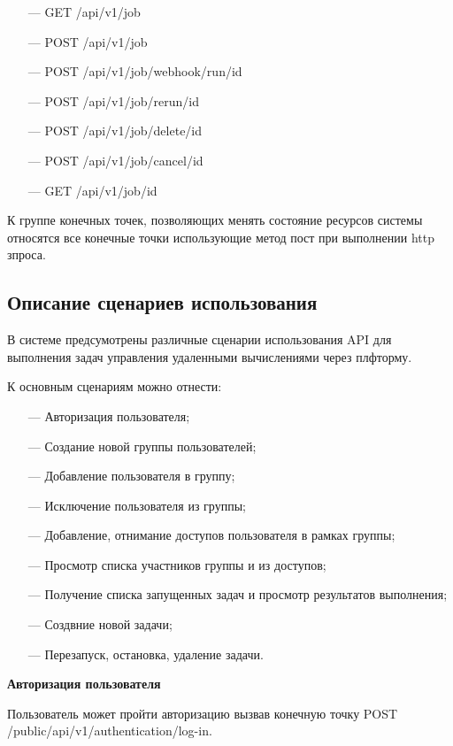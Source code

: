 \begin{itemize}
  \item[---] GET /api/v1/job
  \item[---] POST /api/v1/job
  \item[---] POST /api/v1/job/webhook/run/{id}
  \item[---] POST /api/v1/job/rerun/{id}
  \item[---] POST /api/v1/job/delete/{id}
  \item[---] POST /api/v1/job/cancel/{id}
  \item[---] GET /api/v1/job/{id}
\end{itemize}

К группе конечных точек, позволяющих менять состояние ресурсов системы относятся все конечные точки использующие метод пост при выполнении http зпроса.

\subsection{Описание сценариев использования}

В системе предсумотрены различные сценарии использования API для выполнения задач управления удаленными вычислениями через плфторму.

К основным сценариям можно отнести:

\begin{itemize}
  \item[---] Авторизация пользователя;
  \item[---] Создание новой группы пользователей;
  \item[---] Добавление пользователя в группу;
  \item[---] Исключение пользователя из группы;
  \item[---] Добавление, отнимание доступов пользователя в рамках группы;
  \item[---] Просмотр списка участников группы и из доступов;
  \item[---] Получение списка запущенных задач и просмотр результатов выполнения;
  \item[---] Создвние новой задачи;
  \item[---] Перезапуск, остановка, удаление задачи.
\end{itemize}

{\bf Авторизация пользователя }

Пользователь может пройти авторизацию вызвав конечную точку POST /public/api/v1/authentication/log-in.

